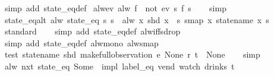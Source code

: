 \begin{isabellebody}
\isamarkupfalse%
\ {\isacharparenleft}simp\ add{\isacharcolon}\ state_eq{\isacharunderscore}def{\isacharparenright}%
\endisatagproof
{\isafoldproof}%
%
\isadelimproof
\isanewline
%
\endisadelimproof
\isanewline
{}\isamarkupfalse%
\ alw{\isacharunderscore}ev{\isacharcolon}\ {\isachardoublequoteopen}alw\ f\ {\isacharequal}\ not\ {\isacharparenleft}ev\ {\isacharparenleft}{\isasymlambda}s{\isachardot}\ {\isasymnot}f\ s{\isacharparenright}{\isacharparenright}{\isachardoublequoteclose}\isanewline
%
\isadelimproof
\ \ %
\endisadelimproof
%
\isatagproof
{}\isamarkupfalse%
\ simp%
\endisatagproof
{\isafoldproof}%
%
\isadelimproof
\isanewline
%
\endisadelimproof
\isanewline
{}\isamarkupfalse%
\ state_eq{\isacharunderscore}alt{\isacharcolon}\ {\isachardoublequoteopen}alw\ {\isacharparenleft}state_eq\ s{\isacharparenright}\ s{\isacharprime}\ {\isacharequal}\ alw\ {\isacharparenleft}{\isasymlambda}x{\isachardot}\ shd\ x\ {\isacharequal}\ s{\isacharparenright}\ {\isacharparenleft}smap\ {\isacharparenleft}{\isasymlambda}x{\isachardot}\ statename\ x{\isacharparenright}\ s{\isacharprime}{\isacharparenright}{\isachardoublequoteclose}\isanewline
%
\isadelimproof
\ \ %
\endisadelimproof
%
\isatagproof
{}\isamarkupfalse%
\ standard\isanewline
\ \ \isamarkupfalse%
\ {\isacharparenleft}simp\ add{\isacharcolon}\ state_eq{\isacharunderscore}def\ alw{\isacharunderscore}iff{\isacharunderscore}sdrop{\isacharparenright}\isanewline
\ \ \isamarkupfalse%
\ {\isacharparenleft}simp\ add{\isacharcolon}\ state_eq{\isacharunderscore}def\ alw{\isacharunderscore}mono\ alw{\isacharunderscore}smap{\isacharparenright}%
\endisatagproof
{\isafoldproof}%
%
\isadelimproof
\isanewline
%
\endisadelimproof
\isanewline
{}\isamarkupfalse%
\ test{\isacharcolon}\ {\isachardoublequoteopen}statename\ {\isacharparenleft}shd\ {\isacharparenleft}make{\isacharunderscore}full{\isacharunderscore}observation\ e\ None\ r\ t{\isacharparenright}{\isacharparenright}\ {\isacharequal}\ None{\isachardoublequoteclose}\isanewline
%
\isadelimproof
\ \ %
\endisadelimproof
%
\isatagproof
{}\isamarkupfalse%
\ simp%
\endisatagproof
{\isafoldproof}%
%
\isadelimproof
\isanewline
%
\endisadelimproof
\isanewline
{}\isamarkupfalse%
\ {\isachardoublequoteopen}alw\ {\isacharparenleft}nxt\ {\isacharparenleft}state_eq\ {\isacharparenleft}Some\ {}{\isacharparenright}{\isacharparenright}\ impl\ {\isacharparenleft}label_eq\ {\isacharprime}{\isacharprime}vend{\isacharprime}{\isacharprime}{\isacharparenright}{\isacharparenright}\ {\isacharparenleft}watch\ drinks\ t{\isacharparenright}{\isachardoublequoteclose}\isanewline

\end{isabellebody}
